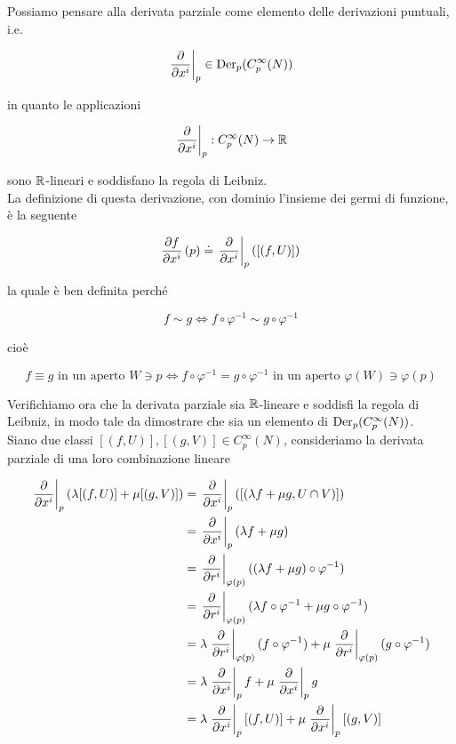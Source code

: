 Possiamo pensare alla derivata parziale come elemento delle derivazioni puntuali, i.e.

\begin{equation}
	\eval{ \pdv{x^{i}} }_{p} \in \der_{p}(C_{p}^{\infty}(N))
\end{equation}

in quanto le applicazioni

\begin{equation}
	\eval{ \pdv{x^{i}} }_{p} : C_{p}^{\infty}(N) \to \R
\end{equation}

sono $ \mathbb{R} $-lineari e soddisfano la regola di Leibniz. \\
La definizione di questa derivazione, con dominio l'insieme dei germi di funzione, è la seguente

\begin{equation}
	\pdv{f}{x^{i}} \, (p) \doteq \eval{ \pdv{x^{i}} }_{p} ([(f,U)])
\end{equation}

la quale è ben definita perché

\begin{equation}
	f \sim g \iff f \circ \varphi^{-1} \sim g \circ \varphi^{-1}
\end{equation}

cioè

\begin{equation}
	 f \equiv g \text{ in un aperto } W \ni p \iff f \circ \varphi^{-1} = g \circ \varphi^{-1} \text{ in un aperto } \varphi(W) \ni \varphi(p)
\end{equation}

Verifichiamo ora che la derivata parziale sia $ \mathbb{R} $-lineare e soddisfi la regola di Leibniz, in modo tale da dimostrare che sia un elemento di $ \operatorname{Der}_{p}(C_{p}^{\infty}(N)) $. \\
Siano due classi $ [(f,U)],[(g,V)] \in C_{p}^{\infty}(N) $, consideriamo la derivata parziale di una loro combinazione lineare

\begin{align}
	\begin{split}
		\eval{ \pdv{x^{i}} }_{p} (\lambda [(f,U)] + \mu [(g,V)]) &= \eval{ \pdv{x^{i}} }_{p} ([(\lambda f + \mu g, U \cap V)]) \\
		&= \eval{ \pdv{x^{i}} }_{p} (\lambda f + \mu g) \\
		&= \eval{ \pdv{r^{i}} }_{\varphi(p)} ((\lambda f + \mu g) \circ \varphi^{-1}) \\
		&= \eval{ \pdv{r^{i}} }_{\varphi(p)} (\lambda f \circ \varphi^{-1} + \mu g \circ \varphi^{-1}) \\
		&= \lambda \eval{ \pdv{r^{i}} }_{\varphi(p)} (f \circ \varphi^{-1}) + \mu \eval{ \pdv{r^{i}} }_{\varphi(p)} (g \circ \varphi^{-1}) \\
		&= \lambda \eval{ \pdv{x^{i}} }_{p} f + \mu \eval{ \pdv{x^{i}} }_{p} g \\
		&= \lambda \eval{ \pdv{x^{i}} }_{p} [(f,U)] + \mu \eval{ \pdv{x^{i}} }_{p} [(g,V)]
	\end{split}
\end{align}


